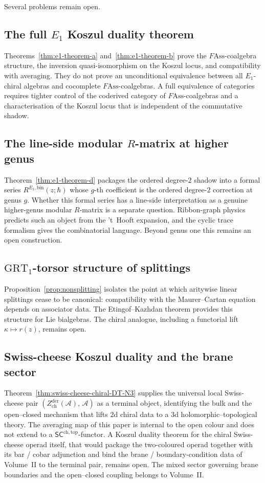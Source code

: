 \documentclass[11pt,reqno]{amsart}
\theoremstyle{definition}
\theoremstyle{remark}
\newcommand{\cA}{\mathcal{A}}
\newcommand{\SCchtop}{\mathsf{SC}^{\mathrm{ch,top}}}
\newcommand{\Ass}{\mathrm{Ass}}
\newcommand{\GRT}{\mathrm{GRT}}
\numberwithin{equation}{section}
\begin{document}
Several problems remain open.

\subsection*{The full $E_{1}$ Koszul duality theorem}

Theorems~\ref{thm:e1-theorem-a} and~\ref{thm:e1-theorem-b} prove
the $F\Ass$-coalgebra structure, the inversion quasi-isomorphism on
the Koszul locus, and compatibility with averaging. They do not
prove an unconditional equivalence between all $E_1$-chiral
algebras and cocomplete $F\Ass$-coalgebras. A full equivalence of
categories requires tighter control of the coderived category of
$F\Ass$-coalgebras and a characterisation of the Koszul locus that
is independent of the commutative shadow.

\subsection*{The line-side modular $R$-matrix at higher genus}

Theorem~\ref{thm:e1-theorem-d} packages the ordered degree-$2$
shadow into a formal series
$R^{E_{1},\mathrm{bin}}(z;\hbar)$ whose $g$-th coefficient is the
ordered degree-$2$ correction at genus $g$. Whether this formal
series has a line-side interpretation as a genuine higher-genus
modular $R$-matrix is a separate question. Ribbon-graph physics
predicts such an object from the 't~Hooft expansion, and the cyclic
trace formalism gives the combinatorial language. Beyond genus one
this remains an open construction.

\subsection*{$\GRT_{1}$-torsor structure of splittings}

Proposition~\ref{prop:nonsplitting} isolates the point at which
aritywise linear splittings cease to be canonical: compatibility
with the Maurer--Cartan equation depends on associator data. The
Etingof--Kazhdan theorem provides this structure for Lie
bialgebras. The chiral analogue, including a functorial lift
$\kappa \mapsto r(z)$, remains open.

\subsection*{Swiss-cheese Koszul duality and the brane sector}

Theorem~\ref{thm:swiss-cheese-chiral-DT-N3} supplies the universal
local Swiss-cheese pair
$(Z^{\mathrm{der}}_{\mathrm{ch}}(\cA),\, \cA)$ as a terminal object,
identifying the bulk and the open--closed mechanism that lifts
$2$d chiral data to a $3$d holomorphic--topological theory. The
averaging map of this paper is internal to the open colour and
does not extend to a $\SCchtop$-functor. A Koszul duality theorem
for the chiral Swiss-cheese operad itself, that would package the
two-coloured operad together with its bar / cobar adjunction and
bind the brane / boundary-condition data of Volume~II to the
terminal pair, remains open. The mixed sector governing brane
boundaries and the open--closed coupling belongs to Volume~II.
\end{document}

